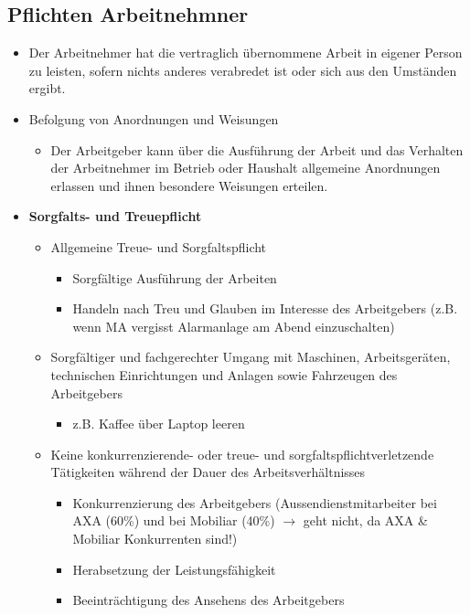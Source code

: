 \newpage

\subsection{Pflichten Arbeitnehmner}
\begin{itemize}
    \item Der Arbeitnehmer hat die vertraglich übernommene Arbeit in eigener Person zu leisten, sofern nichts anderes verabredet ist oder sich aus den Umständen ergibt.
    \item Befolgung von Anordnungen und Weisungen
    \begin{itemize}
        \item Der Arbeitgeber kann über die Ausführung der Arbeit und das Verhalten der Arbeitnehmer im Betrieb oder Haushalt allgemeine Anordnungen erlassen und ihnen besondere Weisungen erteilen.
    \end{itemize}
    \item \textbf{Sorgfalts- und Treuepflicht}
    \begin{itemize}
        \item Allgemeine Treue- und Sorgfaltspflicht
        \begin{itemize}
            \item Sorgfältige Ausführung der Arbeiten
            \item Handeln nach Treu und Glauben im Interesse des Arbeitgebers (z.B. wenn MA vergisst Alarmanlage am Abend einzuschalten)
        \end{itemize}
        \item Sorgfältiger und fachgerechter Umgang mit Maschinen, Arbeitsgeräten, technischen Einrichtungen und Anlagen sowie Fahrzeugen des Arbeitgebers
        \begin{itemize}
            \item z.B. Kaffee über Laptop leeren
        \end{itemize}
        \item Keine konkurrenzierende- oder treue- und sorgfaltspflichtverletzende Tätigkeiten während der Dauer des Arbeitsverhältnisses
        \begin{itemize}
            \item Konkurrenzierung des Arbeitgebers (Aussendienstmitarbeiter bei AXA (60\%) und bei Mobiliar (40\%) $\rightarrow$ geht nicht, da AXA \& Mobiliar Konkurrenten sind!)
            \item Herabsetzung der Leistungsfähigkeit
            \item Beeinträchtigung des Ansehens des Arbeitgebers

\end{itemize}
\end{itemize}
\end{itemize}
